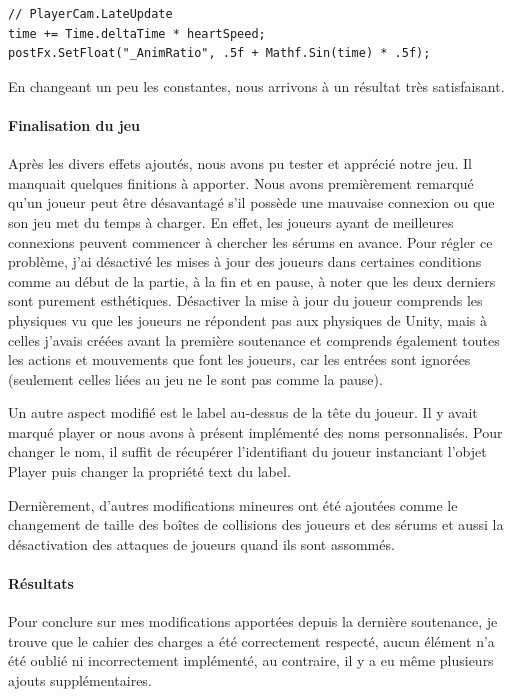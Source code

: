 \documentclass{article}
\begin{document}
\begin{lstlisting}
// PlayerCam.LateUpdate
time += Time.deltaTime * heartSpeed;
postFx.SetFloat("_AnimRatio", .5f + Mathf.Sin(time) * .5f);
\end{lstlisting}


En changeant un peu les constantes, nous arrivons à un résultat très satisfaisant.


\newpage
\paragraph{Finalisation du jeu}


Après les divers effets ajoutés, nous avons pu tester et apprécié notre jeu. Il manquait quelques finitions à apporter.
Nous avons premièrement remarqué qu'un joueur peut être désavantagé s'il possède une mauvaise connexion ou que son jeu met du temps à charger. En effet, les joueurs ayant de meilleures connexions peuvent commencer à chercher les sérums en avance. Pour régler ce problème, j'ai désactivé les mises à jour des joueurs dans certaines conditions comme au début de la partie, à la fin et en pause, à noter que les deux derniers sont purement esthétiques. Désactiver la mise à jour du joueur comprends les physiques vu que les joueurs ne répondent pas aux physiques de Unity, mais à celles j'avais créées avant la première soutenance et comprends également toutes les actions et mouvements que font les joueurs, car les entrées sont ignorées (seulement celles liées au jeu ne le sont pas comme la pause).

Un autre aspect modifié est le label au-dessus de la tête du joueur. Il y avait marqué player or nous avons à présent implémenté des noms personnalisés. Pour changer le nom, il suffit de récupérer l'identifiant du joueur instanciant l'objet Player puis changer la propriété text du label.

Dernièrement, d'autres modifications mineures ont été ajoutées comme le changement de taille des boîtes de collisions des joueurs et des sérums et aussi la désactivation des attaques de joueurs quand ils sont assommés.


\paragraph{Résultats}


Pour conclure sur mes modifications apportées depuis la dernière soutenance, je trouve que le cahier des charges a été correctement respecté, aucun élément n'a été oublié ni incorrectement implémenté, au contraire, il y a eu même plusieurs ajouts supplémentaires.
\end{document}
